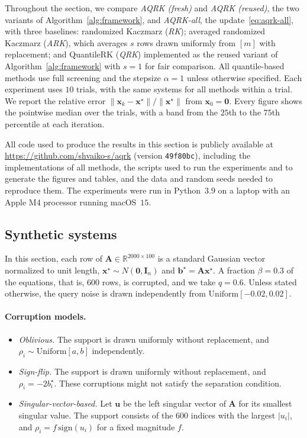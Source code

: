 \documentclass[pdflatex,sn-mathphys-num]{sn-jnl}
\theoremstyle{thmstyleone}
\theoremstyle{thmstylethree}
\newcommand{\mA}{\mathbf{A}}
\newcommand{\vb}{\mathbf{b}}
\newcommand{\vx}{\mathbf{x}}
\begin{document}
Throughout the section, we compare
\emph{AQRK (fresh)} and \emph{AQRK (reused)}, the two variants of
Algorithm~\ref{alg:framework}, and \emph{AQRK-all}, the update~\eqref{eq:aqrk-all},
with three baselines: randomized Kaczmarz (\emph{RK}); averaged randomized Kaczmarz
(\emph{ARK}), which averages $s$ rows drawn uniformly from $[m]$ with
replacement; and QuantileRK (\emph{QRK}) implemented as the
reused variant of Algorithm~\ref{alg:framework} with $s=1$ for fair comparison. All quantile-based methods use full screening and the stepsize $\alpha=1$ unless otherwise specified.
Each experiment uses $10$ trials, with the same systems for all methods within
a trial. We report the relative error $\|\vx_k-\vx^\star\|/\|\vx^\star\|$ from
$\vx_0=\boldsymbol 0$. Every figure shows the pointwise median over the trials,
with a band from the $25$th to the $75$th percentile  at each iteration.

All code used to produce the results in this section is publicly available at
\url{https://github.com/shvaiko-s/aqrk} (version \texttt{49f80bc}), including the
implementations of all methods, the scripts used to run the experiments and to
generate the figures and tables, and the data and random seeds needed to reproduce
them. The experiments were run in Python~$3.9$ on a laptop with an Apple M4 processor
running macOS~$15$.

\subsection{Synthetic systems}
\label{sec:general_conv}
In this section, each row of $\mA\in\mathbb R^{2000\times100}$ is a
standard Gaussian vector normalized to unit length,
$\vx^\star\sim N(\boldsymbol 0,\mathbf I_n)$ and $\vb^\star=\mA\vx^\star$. A fraction $\beta=0.3$ of the
equations, that is, $600$ rows, is corrupted, and we take $q = 0.6$. Unless stated otherwise, the
query noise is drawn independently from $\mathrm{Uniform}[-0.02,0.02]$.


\paragraph{Corruption models.}
\begin{itemize}
\item \emph{Oblivious.} The support is drawn uniformly without replacement, and
$\rho_i\sim\mathrm{Uniform}[a,b]$ independently.
\item \emph{Sign-flip.} The support is drawn uniformly without replacement, and
$\rho_i=-2b_i^\star$. These corruptions might not satisfy the separation condition.
\item \emph{Singular-vector-based.} Let $\mathbf u$ be the left singular vector of
$\mA$ for its smallest singular value. The support consists of the $600$
indices with the largest $|u_i|$, and $\rho_i=f\,\mathrm{sign}(u_i)$ for a
fixed magnitude $f$. 
\end{itemize}
\end{document}
